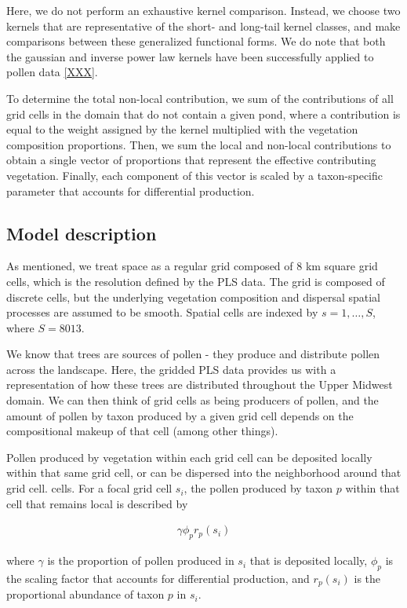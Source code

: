 \documentclass[12pt]{article}
\begin{document}
Here, we do not perform an exhaustive kernel comparison. Instead, we
choose two kernels that are representative of the short- and long-tail
kernel classes, and make comparisons between these generalized
functional forms. We do note that both the gaussian and inverse power
law kernels have been successfully applied to pollen data \ref{XXX}.

To determine the total non-local contribution, we sum of the
contributions of all grid cells in the domain that do not contain a
given pond, where a contribution is equal to the weight assigned by
the kernel multiplied with the vegetation composition
proportions. Then, we sum the local and non-local contributions to
obtain a single vector of proportions that represent the effective
contributing vegetation. Finally, each component of this vector is
scaled by a taxon-specific parameter that accounts for differential
production.

\subsection{Model description}

As mentioned, we treat space as a regular grid composed of 8 km square
grid cells, which is the resolution defined by the PLS data. The grid
is composed of discrete cells, but the underlying vegetation
composition and dispersal spatial processes are assumed to be
smooth. Spatial cells are indexed by $s=1,\ldots,S$, where $S=8013$.

We know that trees are sources of pollen - they produce and distribute
pollen across the landscape. Here, the gridded PLS data provides us
with a representation of how these trees are distributed throughout
the Upper Midwest domain. We can then think of grid cells as being
producers of pollen, and the amount of pollen by taxon produced by a
given grid cell depends on the compositional makeup of that cell
(among other things).

Pollen produced by vegetation within each grid cell can be deposited
locally within that same grid cell, or can be dispersed into the
neighborhood around that grid cell.  cells. For a focal grid cell
$s_i$, the pollen produced by taxon $p$ within that cell that remains
local is described by

\begin{align}
\gamma \phi_p r_p(s_i)
\end{align} 

where $\gamma$ is the proportion of pollen produced in $s_i$ that is deposited locally,
$\phi_p$ is the scaling factor that accounts for differential
production, and $r_p(s_i)$ is the proportional abundance of taxon $p$
in $s_i$.
\end{document}

